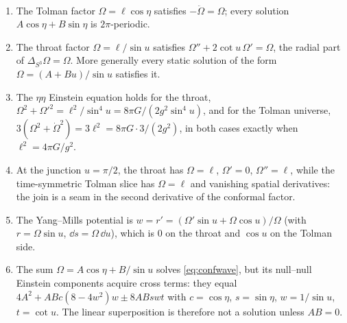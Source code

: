 \begin{theorem}\label{thm:confwave}\ver\
\begin{enumerate}[label=(\roman*)]
\item The Tolman factor $\Omega=\ell\cos\eta$ satisfies $-\ddot\Omega=\Omega$; every solution $A\cos\eta+B\sin\eta$ is $2\pi$-periodic.
\item The throat factor $\Omega=\ell/\sin u$ satisfies $\Omega''+2\cot u\,\Omega'=\Omega$, the radial part of $\Delta_{S^3}\Omega=\Omega$. More generally every static solution of the form $\Omega=(A+Bu)/\sin u$ satisfies it.
\item The $\eta\eta$ Einstein equation holds for the throat, $\Omega^2+\Omega'^2=\ell^2/\sin^4u=8\pi G/(2g^2\sin^4u)$, and for the Tolman universe, $3(\Omega^2+\dot\Omega^2)=3\ell^2=8\pi G\cdot3/(2g^2)$, in both cases exactly when $\ell^2=4\pi G/g^2$.
\item At the junction $u=\pi/2$, the throat has $\Omega=\ell$, $\Omega'=0$, $\Omega''=\ell$, while the time-symmetric Tolman slice has $\Omega=\ell$ and vanishing spatial derivatives: the join is a seam in the second derivative of the conformal factor.
\item The Yang--Mills potential is $w=r'=(\Omega'\sin u+\Omega\cos u)/\Omega$ (with $r=\Omega\sin u$, $\dd s=\Omega\,\dd u$), which is $0$ on the throat and $\cos u$ on the Tolman side.
\item The sum $\Omega=A\cos\eta+B/\sin u$ solves \eqref{eq:confwave}, but its null--null Einstein components acquire cross terms: they equal $4A^2+ABc(8-4w^2)w\pm8ABswt$ with $c=\cos\eta$, $s=\sin\eta$, $w=1/\sin u$, $t=\cot u$. The linear superposition is therefore not a solution unless $AB=0$.
\end{enumerate}
\end{theorem}
